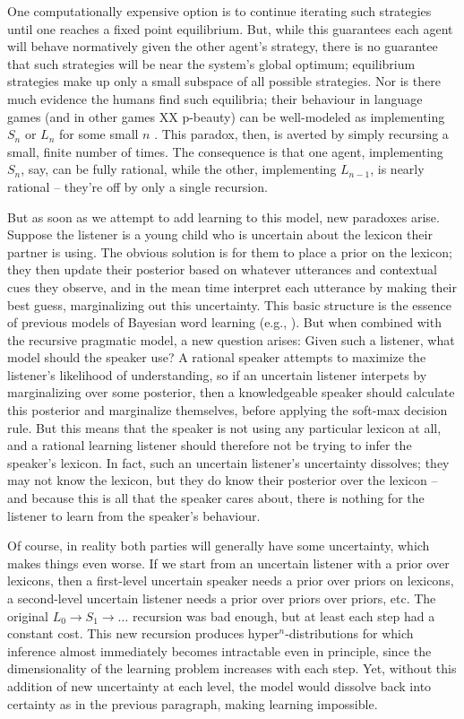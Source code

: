 \documentclass{article} %
\begin{document}
One computationally expensive option is to continue iterating such strategies until one reaches a fixed point equilibrium. But, while this guarantees each agent will behave normatively given the other agent's strategy, there is no guarantee that such strategies will be near the system's global optimum; equilibrium strategies make up only a small subspace of all possible strategies. Nor is there much evidence the humans find such equilibria; their behaviour in language games (and in other games XX p-beauty) can be well-modeled as implementing $S_n$ or $L_n$ for some small $n$ \cite{frank2012}. This paradox, then, is averted by simply recursing a small, finite number of times. The consequence is that one agent, implementing $S_n$, say, can be fully rational, while the other, implementing $L_{n-1}$, is nearly rational -- they're off by only a single recursion.

But as soon as we attempt to add learning to this model, new paradoxes arise. Suppose the listener is a young child who is uncertain about the lexicon their partner is using. The obvious solution is for them to place a prior on the lexicon; they then update their posterior based on whatever utterances and contextual cues they observe, and in the mean time interpret each utterance by making their best guess, marginalizing out this uncertainty. This basic structure is the essence of previous models of Bayesian word learning (e.g., \cite{frank2009}). But when combined with the recursive pragmatic model, a new question arises: Given such a listener, what model should the speaker use? A rational speaker attempts to maximize the listener's likelihood of understanding, so if an uncertain listener interpets by marginalizing over some posterior, then a knowledgeable speaker should calculate this posterior and marginalize themselves, before applying the soft-max decision rule. But this means that the speaker is not using any particular lexicon at all, and a rational learning listener should therefore not be trying to infer the speaker's lexicon. In fact, such an uncertain listener's uncertainty dissolves; they may not know the lexicon, but they do know their posterior over the lexicon -- and because this is all that the speaker cares about, there is nothing for the listener to learn from the speaker's behaviour.

Of course, in reality both parties will generally have some uncertainty, which makes things even worse. If we start from an uncertain listener with a prior over lexicons, then a first-level uncertain speaker needs a prior over priors on lexicons, a second-level uncertain listener needs a prior over priors over priors, etc. The original $L_0 \rightarrow S_1 \rightarrow \dots$ recursion was bad enough, but at least each step had a constant cost. This new recursion produces hyper$^n$-distributions for which inference almost immediately becomes intractable even in principle, since the dimensionality of the learning problem increases with each step. Yet, without this addition of new uncertainty at each level, the model would dissolve back into certainty as in the previous paragraph, making learning impossible.
\end{document}
